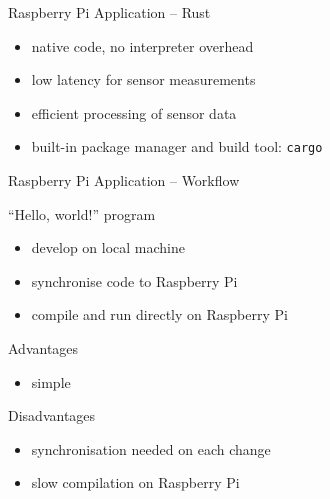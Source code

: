 \documentclass[aspectratio=169]{beamer}
\newcommand\green[1]{{\color{green(ncs)}#1}}
\newcommand\red[1]{{\color{amaranth}#1}}
\begin{document}
  \begin{frame}{Raspberry Pi Application -- Rust}
    \begin{itemize}
      \item native code, no interpreter overhead
      \item low latency for sensor measurements
      \item efficient processing of sensor data
      \item built-in package manager and build tool: \texttt{cargo}
    \end{itemize}
  \end{frame}

  \begin{frame}{Raspberry Pi Application -- Workflow}
    \begin{block}{“Hello, world!” program}
      \begin{itemize}
        \item develop on local machine
        \item synchronise code to Raspberry Pi
        \item compile and run directly on Raspberry Pi
      \end{itemize}
    \end{block}
    \begin{block}{\green{Advantages}}
      \begin{itemize}
        \item simple
      \end{itemize}
    \end{block}
    \begin{block}{\red{Disadvantages}}
      \begin{itemize}
        \item synchronisation needed on each change
        \item slow compilation on Raspberry Pi
      \end{itemize}
    \end{block}
  \end{frame}
\end{document}
